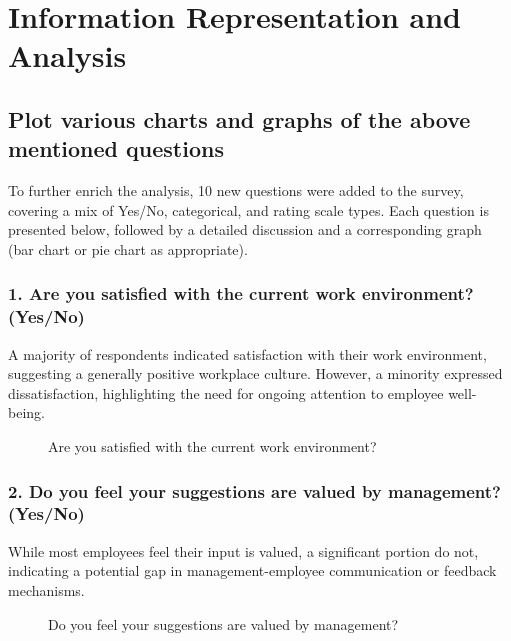 \section{Information Representation and Analysis}

\subsection{Plot various charts and graphs of the above mentioned questions}

To further enrich the analysis, 10 new questions were added to the survey, covering a mix of Yes/No, categorical, and rating scale types. Each question is presented below, followed by a detailed discussion and a corresponding graph (bar chart or pie chart as appropriate).

\subsubsection*{1. Are you satisfied with the current work environment? (Yes/No)}

A majority of respondents indicated satisfaction with their work environment, suggesting a generally positive workplace culture. However, a minority expressed dissatisfaction, highlighting the need for ongoing attention to employee well-being.

\begin{figure}[H]
    \centering
    \caption{Are you satisfied with the current work environment?}
    \label{fig:work_env}
\end{figure}

\subsubsection*{2. Do you feel your suggestions are valued by management? (Yes/No)}

While most employees feel their input is valued, a significant portion do not, indicating a potential gap in management-employee communication or feedback mechanisms.

\begin{figure}[H]
    \centering
    \caption{Do you feel your suggestions are valued by management?}
    \label{fig:suggestions_valued}
\end{figure}

